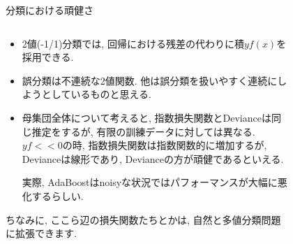 \documentclass[dvipdfmx,8pt]{beamer}
\begin{document}
  \begin{frame}{分類における頑健さ}
    \begin{columns}[t]
      \begin{column}{0.5\linewidth}
        \begin{itemize}
          \item 2値(-1/1)分類では, 回帰における残差の代わりに積$yf(x)$を採用できる.
          \item 誤分類は不連続な2値関数. 他は誤分類を扱いやすく連続にしようとしているものと思える.
          \item 母集団全体について考えると, 指数損失関数とDevianceは同じ推定をするが, 有限の訓練データに対しては異なる. $yf << 0$の時, 指数損失関数は指数関数的に増加するが, Devianceは線形であり, Devianceの方が頑健であるといえる.

          実際, AdaBoostはnoisyな状況ではパフォーマンスが大幅に悪化するらしい.
        \end{itemize}
        ちなみに, ここら辺の損失関数たちとかは, 自然と多値分類問題に拡張できます.
      \end{column}
      \begin{column}{0.5\linewidth}
        \begin{figure}[htb]
          \centering
          \includegraphics[width=5cm,clip]{images/RobustnessClassification.png}
        \end{figure}
      \end{column}
    \end{columns}
  \end{frame}
\end{document}
